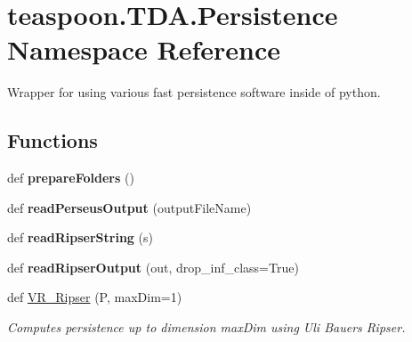 \hypertarget{namespaceteaspoon_1_1_t_d_a_1_1_persistence}{}\section{teaspoon.\+T\+D\+A.\+Persistence Namespace Reference}
\label{namespaceteaspoon_1_1_t_d_a_1_1_persistence}


Wrapper for using various fast persistence software inside of python.  


\subsection*{Functions}
\begin{DoxyCompactItemize}
\item 
\mbox{\label{namespaceteaspoon_1_1_t_d_a_1_1_persistence_aa767596a9f61323ef4e489e42890cd45}} 
def {\bfseries prepare\+Folders} ()
\item 
\mbox{\label{namespaceteaspoon_1_1_t_d_a_1_1_persistence_a3d273210437e69be2df595ed1751c661}} 
def {\bfseries read\+Perseus\+Output} (output\+File\+Name)
\item 
\mbox{\label{namespaceteaspoon_1_1_t_d_a_1_1_persistence_a862eea03c953145bb9290c1681f1f850}} 
def {\bfseries read\+Ripser\+String} (s)
\item 
\mbox{\label{namespaceteaspoon_1_1_t_d_a_1_1_persistence_a18684f9ea2d52bb31094f8de25dcbc90}} 
def {\bfseries read\+Ripser\+Output} (out, drop\+\_\+inf\+\_\+class=True)
\item 
def \hyperlink{namespaceteaspoon_1_1_t_d_a_1_1_persistence_ae38f90d312da5c7fb8587a2f44e67b8a}{V\+R\+\_\+\+Ripser} (P, max\+Dim=1)
\begin{DoxyCompactList}\small\item\em Computes persistence up to dimension max\+Dim using Uli Bauer\textquotesingle{}s Ripser. \end{DoxyCompactList}\item 
\mbox{\label{namespaceteaspoon_1_1_t_d_a_1_1_persistence_a074e092c57bca5b1652c7b2a2c41f603}} 

\end{DoxyCompactItemize}
